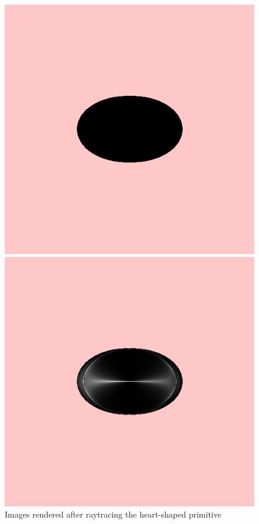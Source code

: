 \begin{figure}[htbp]
\begin{minipage}{0.2\textheight}
\begin{flushleft}
\includegraphics[trim=0.0cm 0.4cm 0.2cm 0.2cm, clip=true, totalheight=0.2\textheight]{Pictures/Above.png}
\end{flushleft}
\end{minipage}
\begin{minipage}{0.2\textheight}
\begin{flushleft}
\includegraphics[trim=0.0cm 0.4cm 0.2cm 0.2cm, clip=true, totalheight=0.2\textheight]{Pictures/Below.png}
\end{flushleft}
\end{minipage}
\caption[Images rendered after ray­tracing the heart­-shaped primitive]{Images rendered after ray­tracing the heart-­shaped primitive}
\label{Besides}
\end{figure}

